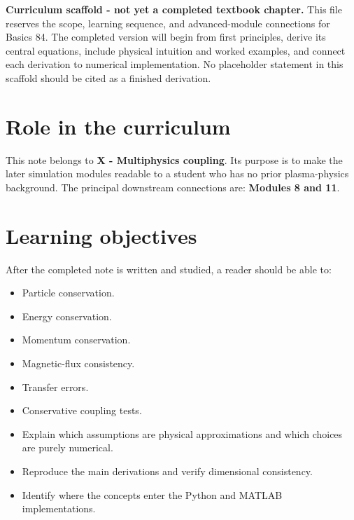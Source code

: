 \documentclass[11pt]{article}
\begin{document}

\begin{overviewbox}
\textbf{Curriculum scaffold - not yet a completed textbook chapter.} This file reserves the scope, learning sequence, and advanced-module connections for Basics 84. The completed version will begin from first principles, derive its central equations, include physical intuition and worked examples, and connect each derivation to numerical implementation. No placeholder statement in this scaffold should be cited as a finished derivation.
\end{overviewbox}

\ProjectTOC

\section{Role in the curriculum}
This note belongs to \textbf{X - Multiphysics coupling}. Its purpose is to make the later simulation modules readable to a student who has no prior plasma-physics background. The principal downstream connections are: \textbf{Modules 8 and 11}.

\section{Learning objectives}
After the completed note is written and studied, a reader should be able to:
\begin{itemize}[leftmargin=1.6em]
\item Particle conservation.
\item Energy conservation.
\item Momentum conservation.
\item Magnetic-flux consistency.
\item Transfer errors.
\item Conservative coupling tests.
\item Explain which assumptions are physical approximations and which choices are purely numerical.
\item Reproduce the main derivations and verify dimensional consistency.
\item Identify where the concepts enter the Python and MATLAB implementations.
\end{itemize}
\end{document}

